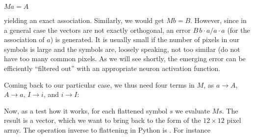 \documentclass[letterpaper,10pt,english]{jupyterBook}
\begin{document}
\sphinxAtStartPar
\( M a =  A\)

\sphinxAtStartPar
yielding an exact association. Similarly, we would get \(M b = B\). However, since in a general case the vectors are not exactly orthogonal, an error \(B \, b \cdot a/a \cdot a\) (for the association of \(a\)) is generated. It is usually small if the number of pixels in our symbols is large and the symbols are, loosely speaking, not too similar (do not have too many common pixels. As we will see shortly, the emerging error can be efficiently “filtered out” with an appropriate neuron activation function.

\sphinxAtStartPar
Coming back to our particular case, we thus need four terms in \(M\), as
\(a \to A\), \(A\to a\), \(I \to i\), and \(i \to I\):

\begin{sphinxVerbatim}[commandchars=\\\{\}]
    
\end{sphinxVerbatim}

\sphinxAtStartPar
Now, as a test how it works, for each flattened symbol \(s\) we evaluate \(Ms\). The result is a vector, which we want to bring back to the form of the \(12\times 12\) pixel array. The operation inverse to flattening in Python is . For instance

\begin{sphinxVerbatim}[commandchars=\\\{\}]
\PYG{p}{[}\PYG{p}{]} 
 
\end{sphinxVerbatim}
\end{document}
